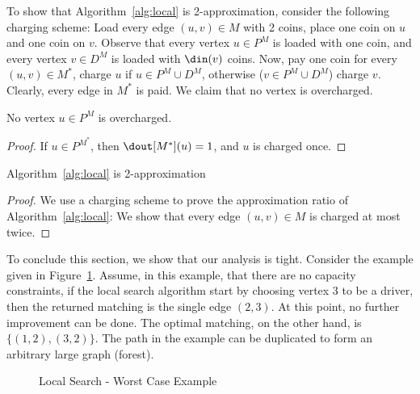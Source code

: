 To show that Algorithm~\ref{alg:local} is 2-approximation, 
consider the following charging scheme:
Load every edge $(u,v) \in M$ with 2 coins, 
place one coin on $u$ and one coin on $v$.
Observe that every vertex $u \in P^M$ is loaded with one coin, 
and every vertex $v \in D^M$ is loaded with $\din(v)$ coins.   
Now, pay one coin for every $(u,v) \in M^*$, charge $u$ if $u \in P^M \cup D^M$, 
otherwise ($v \in P^M \cup D^M$) charge $v$.
Clearly, every edge in $M^*$ is paid.
We claim that no vertex is overcharged.

\begin{lemma}
No vertex $u \in P^M$ is overcharged.
\end{lemma}

\begin{proof}
If $u \in P^{M^*}$, then $\dout[M^*](u) = 1$, and $u$ is charged once.
\end{proof}

\begin{theorem}
Algorithm~\ref{alg:local} is 2-approximation
\end{theorem}
\begin{proof}
We use a charging scheme to prove the approximation ratio of Algorithm~\ref{alg:local}:
We show that every edge $(u,v) \in M$ is charged at most twice.

\end{proof}


\begin{figure}
\centering

\end{figure}


To conclude this section, we show that our analysis is tight.
Consider the example given in Figure~\ref{fig:localtight}.
Assume, in this example, that there are no capacity constraints,
if the local search algorithm start by choosing vertex $3$ to be a driver, 
then the returned matching is the single edge $(2,3)$.
At this point, no further improvement can be done.
The optimal matching, on the other hand, is $\{(1, 2), (3, 2)\}$. 
The path in the example can be duplicated to form an arbitrary large graph (forest).

\begin{figure} 

\caption{
\label{fig:localtight}
Local Search - Worst Case Example
}
\end{figure}